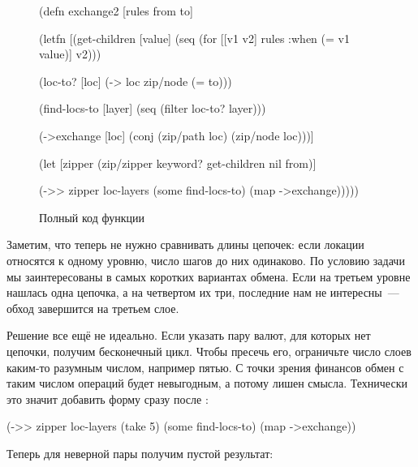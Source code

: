 \begin{figure}[ht!]

\begin{english}
  \begin{clojure}
(defn exchange2 [rules from to]

  (letfn [(get-children [value]
            (seq (for [[v1 v2] rules
                       :when (= v1 value)]
                   v2)))

          (loc-to? [loc]
            (-> loc zip/node (= to)))

          (find-locs-to [layer]
            (seq (filter loc-to? layer)))

          (->exchange [loc]
            (conj (zip/path loc) (zip/node loc)))]

    (let [zipper (zip/zipper keyword?
                             get-children
                             nil
                             from)]

      (->> zipper
           loc-layers
           (some find-locs-to)
           (map ->exchange)))))
  \end{clojure}
\end{english}

\caption{Полный код функции }
\label{fig:chart-xml-04}

\end{figure}

Заметим, что теперь не нужно сравнивать длины цепочек: если локации относятся к
одному уровню, число шагов до них одинаково. По условию задачи мы заинтересованы
в самых коротких вариантах обмена. Если на третьем уровне нашлась одна цепочка,
а на четвертом их три, последние нам не интересны~--- обход завершится на третьем
слое.

Решение все ещё не идеально. Если указать пару валют, для которых нет цепочки,
получим бесконечный цикл. Чтобы пресечь его, ограничьте число слоев каким-то
разумным числом, например пятью. С точки зрения финансов обмен с таким числом
операций будет невыгодным, а потому лишен смысла. Технически это значит добавить
форму  сразу после :

\begin{english}
  \begin{clojure}
(->> zipper
     loc-layers
     (take 5)
     (some find-locs-to)
     (map ->exchange))
  \end{clojure}
\end{english}

Теперь для неверной пары получим пустой результат:


